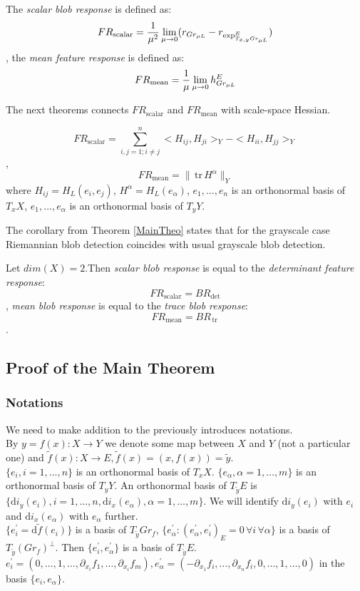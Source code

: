 \documentclass{llncs}
\newcommand{\partderiv}[2]{\partial_{#2} {#1}}
\newcommand{\Diff}{\mathrm{d}}
\newcommand{\TangentSpaceArg}[2]{{T_{#2}}{#1}}
\newcommand{\FRScalar}{FR_{\mathrm{scalar}}}
\newcommand{\FRMean}{FR_{\mathrm{mean}}}
\newcommand {\tr}{{\,}\mathrm{tr}{\,}}
\begin{document}
\begin{definition} \label{RiemanDef}
The \emph{scalar blob response} is defined as:
$$\FRScalar=\frac{1}{\mu ^ 2}\lim_{\mu\to 0} ( r_{Gr_{\mu L}} - r_{\tensor*{\exp}{^E_{\TangentSpaceArg{Gr_{\mu L}}{x,y}}}} )$$,
the \emph{mean feature response} is defined as:
$$\FRMean=\frac{1}{\mu}\lim_{\mu\to 0} \tensor*{h}{^E_{Gr_{\mu L}}}$$
\end{definition}

The next theorems connects $\FRScalar$ and $\FRMean$ with scale-space Hessian.

\begin{theorem} \label{MainTheo}
$$\FRScalar=\sum_{i,j=1; i\ne j}^{n}{<H_{ij},H_{ji}>_Y-<H_{ii},H_{jj}>_Y}$$,
$$\FRMean=\|\tr H^\alpha\|_Y$$
where $H_{ij}=H_L (e_i,e_j)$, $H^\alpha=H_L (e_\alpha)$, 
$e_1,\dots,e_n$ is an orthonormal basis of $\TangentSpaceArg{X}{x}$, $e_1,\dots,e_\alpha$ is an orthonormal basis of $\TangentSpaceArg{Y}{y}$.
\end{theorem}

The corollary from Theorem \ref{MainTheo} states that for the grayscale case Riemannian blob detection coincides with usual grayscale blob detection.

\begin{corollary}\label{GrayscaleCol}
Let $dim(X)=2$.Then \emph{scalar blob response} is equal to the \emph{determinant feature response}:
$$\FRScalar=BR_{\det}$$,
\emph{mean blob response} is equal to the \emph{trace blob response}:
$$\FRMean=BR_{\tr}$$.
\end{corollary}

\subsection{Proof of the Main Theorem}
\subsubsection{Notations}
We need to make addition to the previously introduces notations.
\\
By $y = f(x):X\to Y$ we denote some map between $X$ and $Y$ (not a particular one) and $\tilde{f}(x):X \to E, \tilde{f}(x)=(x,f(x))=\tilde{y}$.
\\
$\{e_i, i=1,\dots,n\}$ is an orthonormal basis of $T_x X$. $\{e_\alpha, \alpha=1,\dots,m\}$ is an orthonormal basis of $T_y Y$.
An orthonormal basis of $T_{\tilde{y}} E$ is $\{\Diff i_y(e_i), i=1,\dots,n, \Diff i_x(e_\alpha),\alpha=1,\dots,m\}$. We will identify $\Diff i_y(e_i)$ with $e_i$ and $\Diff i_x(e_\alpha)$ with $e_\alpha$ further. 
\\
$\{e_i^{'}=\Diff \tilde{f}(e_i)\}$ is a basis of $T_{\tilde{y}} Gr_f$, 
$\{e_\alpha^{'}: (e_\alpha^{'},e_i^{'})_{E} = 0 \,\forall i \, \forall \alpha \}$ is a basis of $T_{\tilde{y}} (Gr_f)^{\bot}$. Then $\{e_i^{'}, e_\alpha^{'}\}$ is a basis of $T_{\tilde{y}} E$. $e_i^{'} = (0,\dots,1, \dots, \partderiv{f_1}{x_i}, \dots, \partderiv{f_m}{x_i}), 
e_{\alpha}^{'}=(-\partderiv{f_i}{x_1}, \dots, \partderiv{f_i}{x_n}, 0,\dots,1, \dots,0)$ in the basis $\{e_i, e_\alpha\}$.
\end{document}
